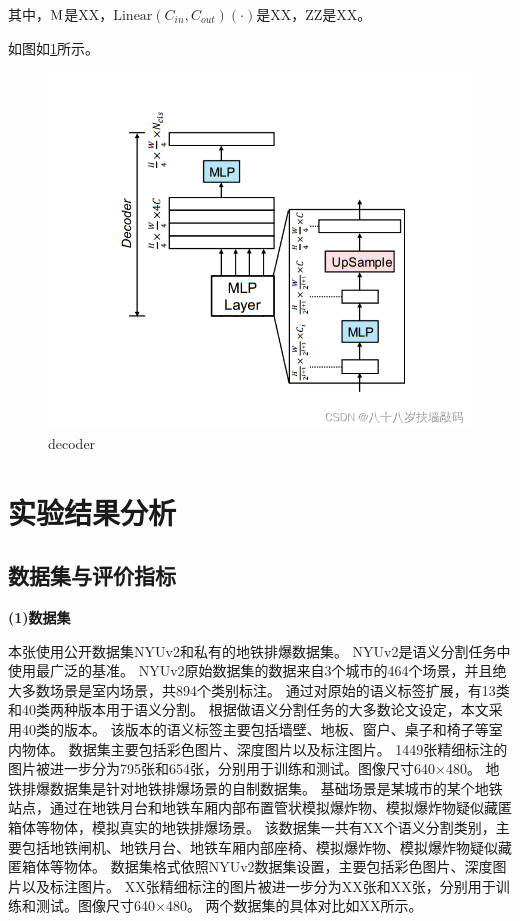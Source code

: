 其中，${\rm M}$是XX，$\text{Linear}(C_{in}, C_{out})(\cdot)$是XX，ZZ是XX。

如图如\ref{图：decoder}所示。
\begin{figure}[h]
	\centering
	\includegraphics[width=\textwidth]{figures/decoder.png}
	\caption{decoder}
	\label{图：decoder}
\end{figure}







\section{实验结果分析}
\subsection{数据集与评价指标}
\textbf{(1)数据集}

本张使用公开数据集NYUv2和私有的地铁排爆数据集。
NYUv2是语义分割任务中使用最广泛的基准。
NYUv2原始数据集的数据来自3个城市的464个场景，并且绝大多数场景是室内场景，共894个类别标注。
通过对原始的语义标签扩展，有13类和40类两种版本用于语义分割。
根据做语义分割任务的大多数论文设定，本文采用40类的版本。
该版本的语义标签主要包括墙壁、地板、窗户、桌子和椅子等室内物体。
数据集主要包括彩色图片、深度图片以及标注图片。
1449张精细标注的图片被进一步分为795张和654张，分别用于训练和测试。图像尺寸640×480。
地铁排爆数据集是针对地铁排爆场景的自制数据集。
基础场景是某城市的某个地铁站点，通过在地铁月台和地铁车厢内部布置管状模拟爆炸物、模拟爆炸物疑似藏匿箱体等物体，模拟真实的地铁排爆场景。
该数据集一共有XX个语义分割类别，主要包括地铁闸机、地铁月台、地铁车厢内部座椅、模拟爆炸物、模拟爆炸物疑似藏匿箱体等物体。
数据集格式依照NYUv2数据集设置，主要包括彩色图片、深度图片以及标注图片。
XX张精细标注的图片被进一步分为XX张和XX张，分别用于训练和测试。图像尺寸640×480。
两个数据集的具体对比如XX所示。

